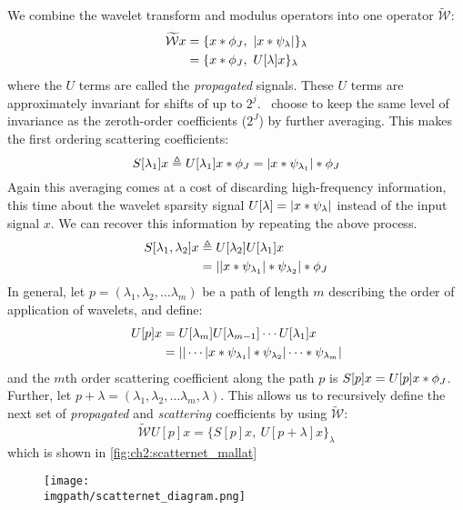 We combine the wavelet transform and modulus operators into one operator
$\widetilde{\mathcal{W}}$:
\begin{align}
  \widetilde{\mathcal{W}}x &= \{ x \ast \phi_J,\ |x \ast \psi_\lambda| \}_\lambda \label{eq:ch2:wave3}\\
             &= \{ x \ast \phi_J,\ U[\lambda]x \}_\lambda
\end{align}
where the $U$ terms are called the \emph{propagated} signals.
These $U$ terms are approximately invariant for shifts of up to $2^j$. \Mallat\ choose to
keep the same level of invariance as the zeroth-order coefficients ($2^J$)
by further averaging. This makes the first ordering scattering coefficients:
\begin{equation}
  S[\lambda_1]x \triangleq U[\lambda_1]x \ast \phi_J
  = |x \ast \psi_{\lambda_1}| \ast \phi_J
\end{equation}
Again this averaging comes at a cost of discarding high-frequency information,
this time about the wavelet sparsity signal $U[\lambda] = |x \ast
\psi_\lambda|$ instead of the input signal $x$. We can recover this information
by repeating the above process.
\begin{align}
  S[\lambda_1, \lambda_2]x &\triangleq U[\lambda_2]U[\lambda_1]x \\
                           &=||x \ast \psi_{\lambda_1}| \ast \psi_{\lambda_2}| \ast \phi_J
\end{align}
In general, let $p=(\lambda_1, \lambda_2, \ldots \lambda_m)$ be a path of length
$m$ describing the order of application of wavelets, and define:
\begin{align}
  U[p]x &= U[\lambda_m]U[\lambda_{m-1}]\cdots U[\lambda_1]x \\
        &= || \cdots |x \ast \psi_{\lambda_1}| \ast \psi_{\lambda_2} | \cdots
  \ast \psi_{\lambda_m}| \label{eq:ch2:u_path}
\end{align}
and the $m$th order scattering coefficient along the path $p$ is $S[p]x = U[p]x
\ast \phi_J$. Further, let $p+\lambda = (\lambda_1, \lambda_2, \ldots
\lambda_m, \lambda)$.  This allows us to recursively define the next set of
\emph{propagated} and \emph{scattering} coefficients by using $\widetilde{\mathcal{W}}$:
\begin{equation}
  \widetilde{\mathcal{W}}U[p]x = \{ S[p]x,\ U[p+\lambda]x \}_\lambda \label{eq:ch2:recursive}
\end{equation}
which is shown in \autoref{fig:ch2:scatternet_mallat}
  \begin{figure}
    \centering
      \texttt{[image: \\imgpath/scatternet\_diagram.png]}
      \label{fig:ch2:scatternet_mallat}
  \end{figure}

